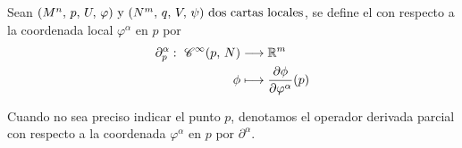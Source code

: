 \begin{definition}
  Sean $(M^n,\thinspace p,\thinspace U,\thinspace\varphi)\textmd{ y } (N^m,\thinspace q,\thinspace V,\thinspace\psi)\textmd{ dos cartas locales}$, se define el
   con
  respecto a la coordenada local $\varphi^\alpha$ en $p$ por
  \begin{equation*}
    \begin{alignedat}{1}
      \partial^\alpha_p:\ \mathscr{C}^\infty(p,\thinspace N) & \longrightarrow \mathbb{R}^m \\ \phi & \longmapsto \frac{\partial
      \phi}{\partial\varphi^\alpha}(p)
    \end{alignedat}
  \end{equation*}
\end{definition}

\begin{notation}
Cuando no sea preciso indicar el punto $p$, denotamos el operador derivada parcial con respecto a la coordenada
$\varphi^\alpha$ en $p$ por $\partial^\alpha$.
\end{notation}

